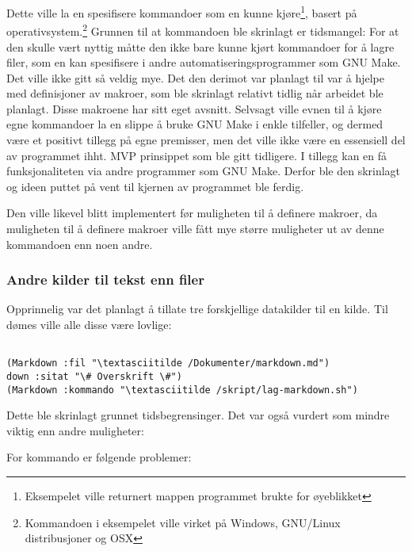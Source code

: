 \documentclass[11pt]{article}
\begin{document}
Dette ville la en spesifisere kommandoer som en kunne kjøre\footnote{Eksempelet ville returnert mappen programmet brukte for øyeblikket}, basert på operativsystem.\footnote{Kommandoen i eksempelet ville virket på Windows, GNU/Linux distribusjoner og OSX}
Grunnen til at kommandoen ble skrinlagt er tidsmangel: For at den skulle vært nyttig måtte den ikke bare kunne kjørt kommandoer for å lagre filer, som en kan spesifisere i andre automatiseringsprogrammer som GNU Make.
Det ville ikke gitt så veldig mye. Det den derimot var planlagt til var å hjelpe med definisjoner av makroer, som ble skrinlagt relativt tidlig når arbeidet ble planlagt. Disse makroene har sitt eget avsnitt.
Selvsagt ville evnen til å kjøre egne kommandoer la en slippe å bruke GNU Make i enkle tilfeller, og dermed være et positivt tillegg på egne premisser, men det ville ikke være en essensiell del av programmet ihht. MVP prinsippet som ble gitt tidligere.
I tillegg kan en få funksjonaliteten via andre programmer som GNU Make. Derfor ble den skrinlagt og ideen puttet på vent til kjernen av programmet ble ferdig.



Den ville likevel blitt implementert før muligheten til å definere makroer, da muligheten til å definere makroer ville fått mye større muligheter ut av denne kommandoen enn noen andre.



\subsubsection{Andre kilder til tekst enn filer}



Opprinnelig var det planlagt å tillate tre forskjellige datakilder til en kilde. Til dømes ville alle disse være lovlige:




\begin{lstlisting}

(Markdown :fil "\textasciitilde /Dokumenter/markdown.md")
down :sitat "\# Overskrift \#")
(Markdown :kommando "\textasciitilde /skript/lag-markdown.sh")
\end{lstlisting}




Dette ble skrinlagt grunnet tidsbegrensinger. Det var også vurdert som mindre viktig enn andre muligheter:



For kommando er følgende problemer:
\end{document}
